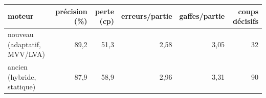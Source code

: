 \begin{tabular}{lrrrrr}
\toprule
moteur & précision (\%) & perte (cp) & erreurs/partie & gaffes/partie & coups décisifs\\
\midrule
nouveau (adaptatif, MVV/LVA) & 89{,}2 & 51{,}3 & 2{,}58 & 3{,}05 & 32\\
ancien (hybride, statique) & 87{,}9 & 58{,}9 & 2{,}96 & 3{,}31 & 90\\
\bottomrule
\end{tabular}
